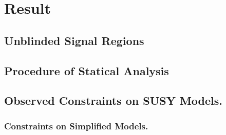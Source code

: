 \section{Result} 
	\subsection{Unblinded Signal Regions}
	\subsection{Procedure of Statical Analysis}
	\subsection{Observed Constraints on SUSY Models.}
		\subsubsection{Constraints on Simplified Models.} 
%
